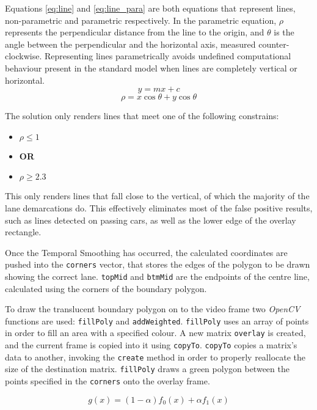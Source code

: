 \documentclass[conference]{IEEEtran}
\begin{document}
Equations \ref{eq:line} and \ref{eq:line_para} are both equations that represent lines, non-parametric and parametric respectively. In the parametric equation, $\rho$ represents the perpendicular distance from the line to the origin, and $\theta$ is the angle between the perpendicular and the horizontal axis, measured counter-clockwise\cite{HoughRT}. Representing lines parametrically avoids undefined computational behaviour present in the standard model when lines are completely vertical or horizontal. 
\begin{equation}\label{eq:line}
y = mx + c
\end{equation}
\begin{equation}\label{eq:line_para}
\rho = x \cos\theta + y \cos\theta
\end{equation}

The solution only renders lines that meet one of the following constrains: \begin{itemize}
\item[] $\rho \leq 1$
\item[] \textbf{OR}
\item[] $\rho \geq 2.3$
\end{itemize} This only renders lines that fall close to the vertical, of which the majority of the lane demarcations do. This effectively eliminates most of the false positive results, such as lines detected on passing cars, as well as the lower edge of the overlay rectangle.

Once the Temporal Smoothing has occurred, the calculated coordinates are pushed into the \verb|corners| vector, that stores the edges of the polygon to be drawn showing the correct lane. \verb|topMid| and \verb|btmMid| are the endpoints of the centre line, calculated using the corners of the boundary polygon.

To draw the translucent boundary polygon on to the video frame two \textit{OpenCV} functions are used: \verb|fillPoly| and \verb|addWeighted|. \verb|fillPoly| uses an array of points in order to fill an area with a specified colour\cite{fillPoly}. A new matrix \verb|overlay| is created, and the current frame is copied into it using \verb|copyTo|. \verb|copyTo| copies a matrix's data to another, invoking the \verb|create| method in order to properly reallocate the size of the destination matrix\cite{copyTo}. \verb|fillPoly| draws a green polygon between the points specified in the \verb|corners| onto the overlay frame.

\begin{equation}\label{eq:linblend}
g(x) = (1-\alpha)f_0(x)+\alpha f_1 (x)
\end{equation}
\end{document}
